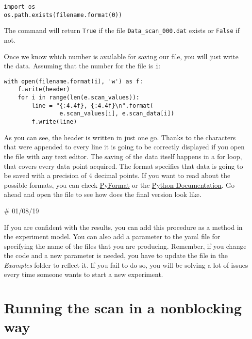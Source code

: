 \begin{verbatim}
import os
os.path.exists(filename.format(0))
\end{verbatim}

The command will return \texttt{True} if the file \texttt{Data_scan_000.dat} exists or \texttt{False} if not.


Once we know which number is available for saving our file, you will just write the data. Assuming that the number for the file is
\texttt{i}:

\begin{verbatim}
with open(filename.format(i), 'w') as f:
    f.write(header)
    for i in range(len(e.scan_values)):
        line = "{:4.4f}, {:4.4f}\n".format(
                e.scan_values[i], e.scan_data[i])
        f.write(line)
\end{verbatim}

As you can see, the header is written in just one go. Thanks to the \texttt{\n} characters that were appended to every line it is going to be correctly displayed if you open the file with any text editor. The saving of the data itself happens in a for loop, that covers every data point acquired. The format specifies that data is going to be saved with a precision of 4 decimal points. If you want to read about the possible formats, you can check \href{https://pyformat.info/}{PyFormat} or the \href{https://docs.python.org/3.6/library/stdtypes.html\#str.format}{Python Documentation}. Go ahead and open the file to see how does the final version look like.

# 01/08/19

If you are confident with the results, you can add this procedure as a method in the experiment model. You can also add a parameter to the yaml file for specifying the name of the files that you are producing. Remember, if you change the code and a new parameter is needed, you have to update the file in the \emph{Examples} folder to reflect it. If you fail to do so, you will be solving a lot of issues every time someone wants to start a new experiment.

\section{Running the scan in a nonblocking way}\label{running-the-scan-in-a-nonblockingway}

